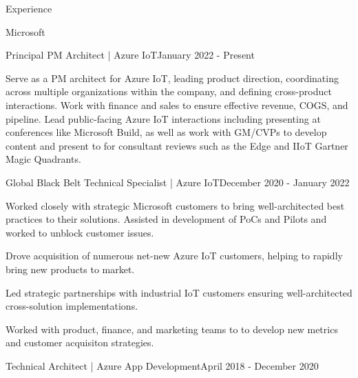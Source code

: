 \documentclass{resume} %
\begin{document}
\begin{rSection}{Experience}


\begin{rSubsection}{Microsoft}{}{}


    \begin{rSubSubsection}{Principal PM Architect | Azure IoT}{January 2022 - Present}{}{} 

        \item Serve as a PM architect for Azure IoT, leading product direction, coordinating across multiple organizations within the company, and defining cross-product interactions.  Work with finance and sales to ensure effective revenue, COGS, and pipeline.  Lead public-facing Azure IoT interactions including presenting at conferences like Microsoft Build, as well as work with GM/CVPs to develop content and present to for consultant reviews such as the Edge and IIoT Gartner Magic Quadrants.
        
    \end{rSubSubsection}


    \begin{rSubSubsection}{Global Black Belt Technical Specialist | Azure IoT}{December 2020 - January 2022}{}{} 

        \item Worked closely with strategic Microsoft customers to bring well-architected best practices to their solutions. Assisted in development of PoCs and Pilots and worked to unblock customer issues.  
        \item Drove acquisition of numerous net-new Azure IoT customers, helping to rapidly bring new products to market.
        \item Led strategic partnerships with industrial IoT customers ensuring well-architected cross-solution implementations.
        \item Worked with product, finance, and marketing teams to to develop new metrics and customer acquisiton strategies.
    
    \end{rSubSubsection}


    \begin{rSubSubsection}{Technical Architect | Azure App Development}{April 2018 - December 2020}{}{}


\end{rSubSubsection}
\end{rSubsection}
\end{rSection}
\end{document}
